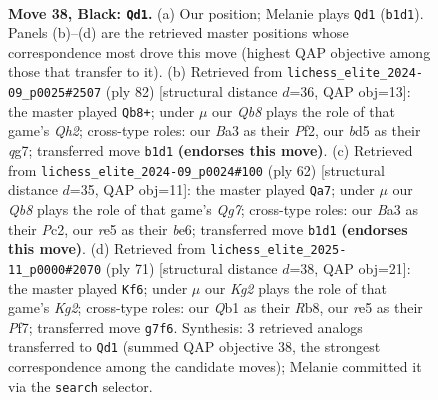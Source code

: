 \documentclass[11pt]{article}
\begin{document}
\clearpage

\begin{figure}[p]\centering
\begin{subfigure}{0.46\textwidth}\centering
\resizebox{\linewidth}{!}{%
\newchessgame
\chessboard[
  setfen={8/pp4kp/6p1/3BR3/5PPP/b7/6K1/1q6 b - - 0 38},
  showmover=false,
  pgfstyle=straightmove, color=movearrow, markmove={b1-d1}
]}
\caption{}
\end{subfigure}\hfill
\begin{subfigure}{0.46\textwidth}\centering
\resizebox{\linewidth}{!}{%
\newchessgame
\chessboard[
  setfen={6k1/6q1/p7/1pp2P2/8/P1P5/KP3P1Q/3r4 w - - 6 42},
  showmover=false,
  pgfstyle=straightmove, color=movearrow, markmove={h2-b8}
]}
\caption{}
\end{subfigure}
\\[4pt]
\begin{subfigure}{0.46\textwidth}\centering
\resizebox{\linewidth}{!}{%
\newchessgame
\chessboard[
  setfen={2r5/6Q1/p2kb3/1p3p2/4p3/2P5/P1P3P1/2K5 w - - 5 32},
  showmover=false,
  pgfstyle=straightmove, color=movearrow, markmove={g7-a7}
]}
\caption{}
\end{subfigure}\hfill
\begin{subfigure}{0.46\textwidth}\centering
\resizebox{\linewidth}{!}{%
\newchessgame
\chessboard[
  setfen={1r6/5pk1/4p2p/5p2/1p1R4/1P1K2P1/5P1P/8 b - - 3 36},
  showmover=false,
  pgfstyle=straightmove, color=movearrow, markmove={g7-f6}
]}
\caption{}
\end{subfigure}
\caption{\textbf{Move 38, Black: \texttt{Qd1}.} (a) Our position; Melanie plays \texttt{Qd1} (\texttt{b1d1}). Panels (b)--(d) are the retrieved master positions whose correspondence most drove this move (highest QAP objective among those that transfer to it). (b) Retrieved from \texttt{lichess\_elite\_2024-09\_p0025\#2507} (ply 82) [structural distance $d$=36, QAP obj=13]: the master played \texttt{Qb8+}; under $\mu$ our \emph{Qb8} plays the role of that game's \emph{Qh2}; cross-type roles: our \emph{B}a3 as their \emph{P}f2, our \emph{b}d5 as their \emph{q}g7; transferred move \texttt{b1d1} \textbf{(endorses this move)}. (c) Retrieved from \texttt{lichess\_elite\_2024-09\_p0024\#100} (ply 62) [structural distance $d$=35, QAP obj=11]: the master played \texttt{Qa7}; under $\mu$ our \emph{Qb8} plays the role of that game's \emph{Qg7}; cross-type roles: our \emph{B}a3 as their \emph{P}c2, our \emph{r}e5 as their \emph{b}e6; transferred move \texttt{b1d1} \textbf{(endorses this move)}. (d) Retrieved from \texttt{lichess\_elite\_2025-11\_p0000\#2070} (ply 71) [structural distance $d$=38, QAP obj=21]: the master played \texttt{Kf6}; under $\mu$ our \emph{Kg2} plays the role of that game's \emph{Kg2}; cross-type roles: our \emph{Q}b1 as their \emph{R}b8, our \emph{r}e5 as their \emph{P}f7; transferred move \texttt{g7f6}. Synthesis: 3 retrieved analogs transferred to \texttt{Qd1} (summed QAP objective 38, the strongest correspondence among the candidate moves); Melanie committed it via the \texttt{search} selector.}
\label{fig:thought-m75}
\end{figure}
\end{document}
